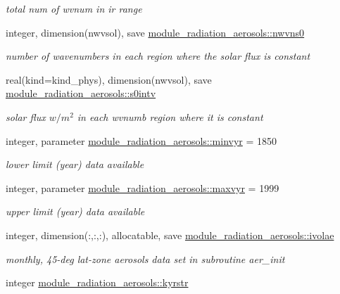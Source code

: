 \begin{DoxyCompactItemize}
\begin{DoxyCompactList}\small\item\em total num of wvnum in ir range \end{DoxyCompactList}\item 
integer, dimension(nwvsol), save \hyperlink{group__module__radiation__aerosols_ga80194c8356dfb92a43306abbe7097711}{module\+\_\+radiation\+\_\+aerosols\+::nwvns0}
\begin{DoxyCompactList}\small\item\em number of wavenumbers in each region where the solar flux is constant \end{DoxyCompactList}\item 
real(kind=kind\+\_\+phys), dimension(nwvsol), save \hyperlink{group__module__radiation__aerosols_gaed8bb8a8bc26d72a6c3d31ed4430941f}{module\+\_\+radiation\+\_\+aerosols\+::s0intv}
\begin{DoxyCompactList}\small\item\em solar flux $w/m^2$ in each wvnumb region where it is constant \end{DoxyCompactList}\item 
integer, parameter \hyperlink{group__module__radiation__aerosols_gab37644d8cc2c222af700b86db91f05e7}{module\+\_\+radiation\+\_\+aerosols\+::minvyr} = 1850
\begin{DoxyCompactList}\small\item\em lower limit (year) data available \end{DoxyCompactList}\item 
integer, parameter \hyperlink{group__module__radiation__aerosols_gad856a3d564ff84043219626759673f27}{module\+\_\+radiation\+\_\+aerosols\+::maxvyr} = 1999
\begin{DoxyCompactList}\small\item\em upper limit (year) data available \end{DoxyCompactList}\item 
integer, dimension(\+:,\+:,\+:), allocatable, save \hyperlink{group__module__radiation__aerosols_gab016f51c81a1157ee234dc82f8f114ee}{module\+\_\+radiation\+\_\+aerosols\+::ivolae}
\begin{DoxyCompactList}\small\item\em monthly, 45-\/deg lat-\/zone aerosols data set in subroutine \textquotesingle{}aer\+\_\+init\textquotesingle{} \end{DoxyCompactList}\item 
integer \hyperlink{group__module__radiation__aerosols_gaf224f7d7991e3d48aeaa4d221da50f41}{module\+\_\+radiation\+\_\+aerosols\+::kyrstr}

\end{DoxyCompactItemize}
